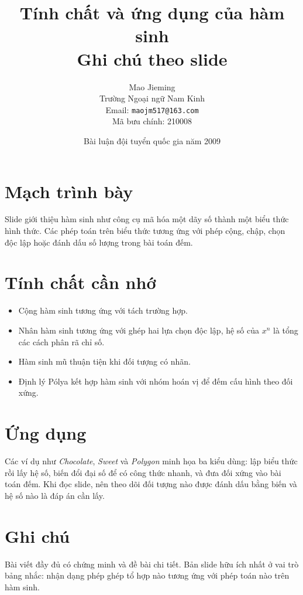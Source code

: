 \documentclass[11pt]{article}
\title{Tính chất và ứng dụng của hàm sinh\\{\large Ghi chú theo slide}}
\author{Mao Jieming\\Trường Ngoại ngữ Nam Kinh\\Email: \texttt{maojm517@163.com}\\Mã bưu chính: 210008}
\date{Bài luận đội tuyển quốc gia năm 2009}
\begin{document}
\maketitle


\section{Mạch trình bày}

Slide giới thiệu hàm sinh như công cụ mã hóa một dãy số thành một biểu thức
hình thức. Các phép toán trên biểu thức tương ứng với phép cộng, chập, chọn
độc lập hoặc đánh dấu số lượng trong bài toán đếm.

\section{Tính chất cần nhớ}

\begin{itemize}
  \item Cộng hàm sinh tương ứng với tách trường hợp.
  \item Nhân hàm sinh tương ứng với ghép hai lựa chọn độc lập, hệ số của
  \(x^n\) là tổng các cách phân rã chỉ số.
  \item Hàm sinh mũ thuận tiện khi đối tượng có nhãn.
  \item Định lý Pólya kết hợp hàm sinh với nhóm hoán vị để đếm cấu hình theo
  đối xứng.
\end{itemize}

\section{Ứng dụng}

Các ví dụ như \textit{Chocolate}, \textit{Sweet} và \textit{Polygon} minh họa
ba kiểu dùng: lập biểu thức rồi lấy hệ số, biến đổi đại số để có công thức
nhanh, và đưa đối xứng vào bài toán đếm. Khi đọc slide, nên theo dõi đối tượng
nào được đánh dấu bằng biến và hệ số nào là đáp án cần lấy.

\section{Ghi chú}

Bài viết đầy đủ có chứng minh và đề bài chi tiết. Bản slide hữu ích nhất ở
vai trò bảng nhắc: nhận dạng phép ghép tổ hợp nào tương ứng với phép toán nào
trên hàm sinh.
\end{document}
